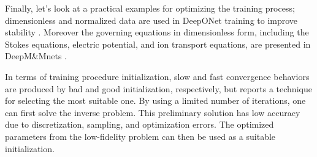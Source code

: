 \documentclass[pdflatex,sn-basic]{sn-jnl}%
\theoremstyle{thmstyleone}%
\theoremstyle{thmstyletwo}%
\theoremstyle{thmstylethree}%
\begin{document}







Finally, let's look at a practical examples for optimizing the training process; dimensionless and normalized data are used in DeepONet training to improve stability \citep{Lin2021_SeamlessMultiscaleOperator_MaxLMLK}. 
Moreover the governing equations in dimensionless form, including the Stokes equations, electric potential, and ion transport equations, are presented in DeepM\&Mnets  \citep{Cai2021_DeepmmnetInferringElectroconvection_WanCWL}.
%


In terms of training procedure initialization, slow and fast convergence behaviors are produced by bad and good initialization, respectively, but \cite{Pan2019_FpinnsFractionalPhysics_LuPLK}  reports a technique for selecting the most suitable one.
By using a limited number of iterations, one can first solve the inverse problem.
This preliminary solution has low accuracy due to discretization, sampling, and optimization errors. The optimized parameters from the low-fidelity problem can then be used as a suitable initialization.










\end{document}
